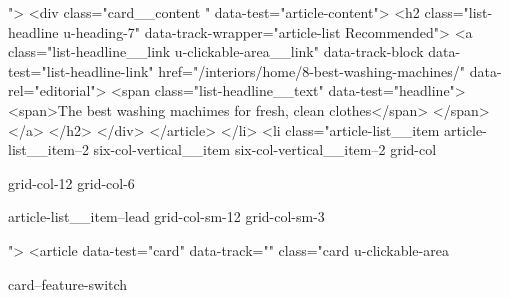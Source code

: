 {{{			
			
			
			 ">
<div class="card__content " data-test="article-content">
<h2 class="list-headline  u-heading-7" data-track-wrapper="article-list Recommended">
<a class="list-headline__link u-clickable-area__link" data-track-block data-test="list-headline-link" href="/interiors/home/8-best-washing-machines/" data-rel="editorial">
<span class="list-headline__text" data-test="headline">
<span>The best washing machimes for fresh, clean clothes</span>
</span>
</a>
</h2>
</div>
</article>
</li>
<li class="article-list__item article-list__item--2 six-col-vertical__item six-col-vertical__item--2
			grid-col
			
			
			
			grid-col-12
			grid-col-6
			
			
			
			
			article-list__item--lead grid-col-sm-12
			grid-col-sm-3
			
			
			
			
			
			
			
			
			">
<article data-test="card" data-track="" class="card
			u-clickable-area
			
			card--feature-switch
			
			
			
			
			
}}}
